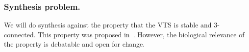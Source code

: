 \subsubsection{Synthesis problem.}

We will do synthesis against the property that the VTS
is stable and 3-connected.
%
%
This property was proposed in~\cite{shukla2017discovering}.
%
However, the biological relevance of the property is debatable and open for change.
%


             
